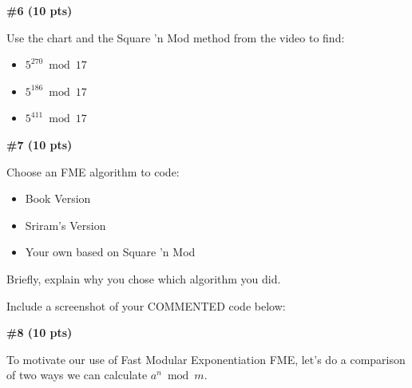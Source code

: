 \documentclass{article}
\newcommand{\sectionbreak}{\clearpage}
\begin{document}
\sectionbreak

\textbf{\#6 (10 pts)}

\bigbreak

Use the chart and the Square 'n Mod method from the video to find:

\bigbreak

\begin{itemize}
    \item $5^{270} \bmod 17$

    \bigbreak



    \bigbreak

    \item $5^{186} \bmod 17$

    \bigbreak



    \bigbreak

    \item $5^{411} \bmod 17$

    \bigbreak



\end{itemize}

\sectionbreak

\textbf{\#7 (10 pts)}

\bigbreak

Choose an FME algorithm to code:
\begin{itemize}
    \item Book Version
    \item Sriram's Version
    \item Your own based on Square 'n Mod
\end{itemize}

\bigbreak

Briefly, explain why you chose which algorithm you did.

\bigbreak



\bigbreak

Include a screenshot of your COMMENTED code below:

\bigbreak


\sectionbreak

\textbf{\#8 (10 pts)}

\bigbreak

To motivate our use of Fast Modular Exponentiation FME, let's do a comparison of two ways we can calculate $a^n \bmod m$.
\end{document}

